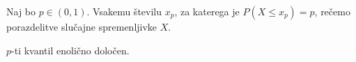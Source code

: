 \begin{definicija}
  Naj bo $p \in (0,1)$.
  Vsakemu številu $x_p$, za katerega je $P(X \le x_p) = p$, rečemo  porazdelitve slučajne spremenljivke $X$.
\end{definicija}

\begin{opomba}
  $p$-ti kvantil  enolično določen.
\end{opomba}

